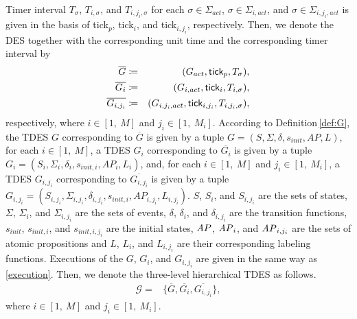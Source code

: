 \documentclass[journal,twoside,web]{IEEEtran}
\newcommand{\rdef}[1]{Definition\,\ref{#1}}
\newcommand{\req}[1]{\eqref{#1}}
\newcommand{\tick}{{\sf tick}}
\newcommand{\AP}{{\textit AP}}
\begin{document}
%
%
%
%
Timer interval $T_\sigma$, $T_{i,\sigma}$, and $T_{i,{j_i},\sigma}$ for each $\sigma\in\Sigma_{act}$, $\sigma\in\Sigma_{i,act}$, and $\sigma\in\Sigma_{i,{j_i},act}$ is given in the basis of \tick$_p$, \tick$_i$, and \tick$_{i,{j_i}}$, respectively.
%
%
Then, we denote the DES together with the corresponding unit time and the corresponding timer interval by
\begin{eqnarray}
\overline{G}&\coloneqq&(G_{act},\mbox{\tick}_p,T_{\sigma}),\notag \\
\overline{G_i}&\coloneqq&(G_{i,act},\mbox{\tick}_i,T_{i,\sigma}),\notag\\
\overline{G_{i,{j_i}}}&\coloneqq&(G_{i,{j_i},act},\mbox{\tick}_{i,{j_i}},T_{i,{j_i},\sigma}),\notag
\end{eqnarray}
respectively, where $i\in [1,\ M]$ and $j_i\in [1,\ M_i]$.
According to \rdef{def:G}, the TDES $G$ corresponding to $\overline{G}$ is given by a tuple $G=(S,\Sigma,\delta,s_{init},AP,L)$, for each $i\in[1,\ M]$, a TDES $G_i$ corresponding to $\overline{G_i}$ is given by a tuple $G_i=(S_{i},\Sigma_{i},\delta_{i},s_{init,i},AP_{i},L_{i})$, and, for each $i\in[1,\ M]$ and $j_i\in[1,\ M_i]$, a TDES $G_{i,{j_i}}$ corresponding to $\overline{G_{i,{j_i}}}$ is given by a tuple $G_{i,j_i}=(S_{i,{j_i}},\Sigma_{i,{j_i}},\delta_{i,{j_i}},s_{init,i},AP_{i,{j_i}},L_{i,{j_i}})$.
%
$S$, $S_i$, and $S_{i,{j_i}}$ are the sets of states, $\Sigma$, $\Sigma_i$, and $\Sigma_{i,{j_i}}$ are the sets of events, $\delta$, $\delta_i$, and $\delta_{i,{j_i}}$ are the transition functions, $s_{init}$, $s_{init,i}$, and $s_{init,i,{j_i}}$ are the initial states, $\AP$, $\AP_i$, and $\AP_{i,{j_i}}$ are the sets of atomic propositions and $L$, $L_i$, and $L_{i,{j_i}}$ are their corresponding labeling functions.
%
Executions of the $G$, $G_{i}$, and $G_{i,{j_i}}$ are given in the same way as \req{execution}. 
%
%
Then, we denote the three-level hierarchical TDES as follows. 
%
\begin{align}\label{htdes}
\mathcal{G}
=&\{\overline{G}, \overline{G_i}, \overline{G_{i,{j_i}}} \},
\end{align}
where $i\in[1,\ M]$ and $j_i\in[1,\ M_i]$.
%
%
\end{document}

